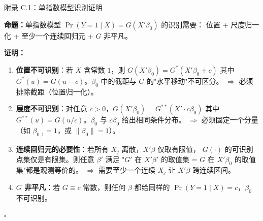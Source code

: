 \documentclass[aspectratio=169, 10pt]{beamer}
\begin{document}
\begin{frame}{附录 C.1：单指数模型识别证明}
  \hypertarget{proof-c1}{}

  \textbf{命题：}单指数模型 $\Pr(Y=1\mid X) = G(X'\beta_0)$ 的识别需要：
  位置 + 尺度归一化 + 至少一个连续回归元 + $G$ 非平凡。

  \textbf{证明：}
  \begin{enumerate}\setlength{\itemsep}{1pt}
    \item \textbf{位置不可识别}：若 $X$ 含常数 $1$，则 $G(X'\beta_0) = G^{*}(X'\beta_0 + c)$
    其中 $G^{*}(u) = G(u-c)$。$\beta_0$ 中的截距与 $G$ 的"水平移动"不可区分。
    $\Rightarrow$ 必须排除截距（位置归一化）。

    \item \textbf{展度不可识别}：对任意 $c > 0$，$G(X'\beta_0) = G^{**}(X' \cdot c\beta_0)$
    其中 $G^{**}(u) = G(u/c)$。$\beta_0$ 与 $c\beta_0$ 给出相同条件分布。
    $\Rightarrow$ 必须固定一个分量（如 $\beta_{0,1} = 1$，或 $\|\beta_0\| = 1$）。

    \item \textbf{连续回归元的必要性}：若所有 $X_j$ 离散，$X'\beta$ 仅取有限值，
    $G(\cdot)$ 的可识别点集仅是有限集。则任意 $\beta'$ 满足
    "$G'$ 在 $X'\beta'$ 的取值集 = $G$ 在 $X'\beta_0$ 的取值集"都是观测等价的。
    $\Rightarrow$ 需要至少一个连续 $X_j$ 让 $X'\beta$ 跨连续区间。

    \item \textbf{$G$ 非平凡}：若 $G \equiv c$ 常数，则任何 $\beta$ 都给同样的
    $\Pr(Y=1\mid X) = c$，$\beta_0$ 不可识别。
  \end{enumerate}
  $\square$
  \hfill{\scriptsize\hyperlink{main-c1}{}}

\end{frame}
\end{document}
